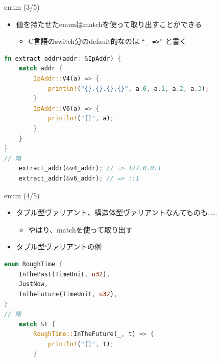 \documentclass[cjk,dvipdfmx,10pt,compress,fragile%
hyperref={bookmarks=true,bookmarksnumbered=true,bookmarksopen=false,%
colorlinks=false,%
pdftitle={第 134 回 関西 Debian 勉強会},%
pdfauthor={小林},%
pdfsubject={資料},%
}]{beamer}
\begin{document}
\begin{frame}[t,fragile]{enum (3/5)}
\begin{itemize}
 \item 値を持たせたenumはmatchを使って取り出すことができる
       \begin{itemize}
	\item C言語のswitch分のdefault的なのは ``\verb|_ =>|'' と書く
       \end{itemize}
\end{itemize}
\begin{lstlisting}[language=Rust,style=boxed,style=colouredRust,basicstyle=\small\tt,lineskip=-2pt]
fn extract_addr(addr: &IpAddr) {
    match addr {
        IpAddr::V4(a) => {
            println!("{}.{}.{}.{}", a.0, a.1, a.2, a.3);
        }
        IpAddr::V6(a) => {
            println!("{}", a);
        }
    }
}
// 略
    extract_addr(&v4_addr); // => 127.0.0.1
    extract_addr(&v6_addr); // => ::1\end{lstlisting}
\end{frame}

\begin{frame}[t,fragile]{enum (4/5)}
 \begin{itemize}
  \item タプル型ヴァリアント、構造体型ヴァリアントなんてものも……
	\begin{itemize}
	 \item やはり、matchを使って取り出す
	\end{itemize}
  \item タプル型ヴァリアントの例
 \end{itemize}
\begin{lstlisting}[language=Rust,style=boxed,style=colouredRust,basicstyle=\small\tt,lineskip=-2pt]
enum RoughTime {
    InThePast(TimeUnit, u32),
    JustNow,
    InTheFuture(TimeUnit, u32),
}
// 略
    match &t {
        RoughTime::InTheFuture(_, t) => {
            println!("{}", t);
        }\end{lstlisting}
\end{frame}
\end{document}
